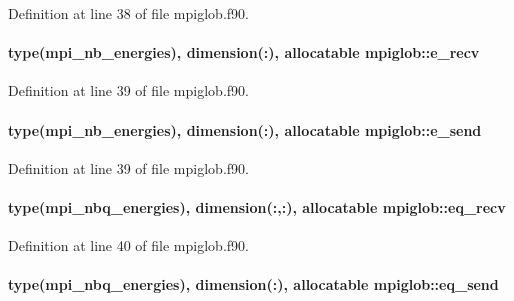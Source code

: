 Definition at line 38 of file mpiglob.\-f90.

\hypertarget{classmpiglob_a727c36858f53d3936ac09c5c47f156de}{
\paragraph[{e\-\_\-recv}]{\setlength{\rightskip}{0pt plus 5cm}type({\bf mpi\-\_\-nb\-\_\-energies}), dimension(\-:), allocatable mpiglob\-::e\-\_\-recv}}\label{classmpiglob_a727c36858f53d3936ac09c5c47f156de}


Definition at line 39 of file mpiglob.\-f90.

\hypertarget{classmpiglob_a62f85c20d3ad9a3d045f88383b4ba347}{
\paragraph[{e\-\_\-send}]{\setlength{\rightskip}{0pt plus 5cm}type({\bf mpi\-\_\-nb\-\_\-energies}), dimension(\-:), allocatable mpiglob\-::e\-\_\-send}}\label{classmpiglob_a62f85c20d3ad9a3d045f88383b4ba347}


Definition at line 39 of file mpiglob.\-f90.

\hypertarget{classmpiglob_a46847840769857fcdc31f2c00a37d2f7}{
\paragraph[{eq\-\_\-recv}]{\setlength{\rightskip}{0pt plus 5cm}type({\bf mpi\-\_\-nbq\-\_\-energies}), dimension(\-:,\-:), allocatable mpiglob\-::eq\-\_\-recv}}\label{classmpiglob_a46847840769857fcdc31f2c00a37d2f7}


Definition at line 40 of file mpiglob.\-f90.

\hypertarget{classmpiglob_aa5162187aa3deaa137edd37c57e87ab6}{
\paragraph[{eq\-\_\-send}]{\setlength{\rightskip}{0pt plus 5cm}type({\bf mpi\-\_\-nbq\-\_\-energies}), dimension(\-:), allocatable mpiglob\-::eq\-\_\-send}}\label{classmpiglob_aa5162187aa3deaa137edd37c57e87ab6}


